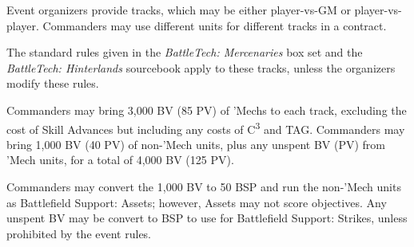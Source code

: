 Event organizers provide tracks, which may be either player-vs-GM or player-vs-player.
Commanders may use different units for different tracks in a contract.

The standard rules given in the \emph{BattleTech: Mercenaries} box set and the \emph{BattleTech: Hinterlands} sourcebook apply to these tracks, unless the organizers modify these rules.

Commanders may bring 3,000 BV (85 PV) of 'Mechs to each track, excluding the cost of Skill Advances but including any costs of C\textsuperscript{3} and TAG.
Commanders may bring 1,000 BV (40 PV) of non-'Mech units, plus any unspent BV (PV) from 'Mech units, for a total of 4,000 BV (125 PV).

Commanders may convert the 1,000 BV to 50 BSP and run the non-'Mech units as Battlefield Support: Assets; however, Assets may not score objectives.
Any unspent BV may be convert to BSP to use for Battlefield Support: Strikes, unless prohibited by the event rules.
